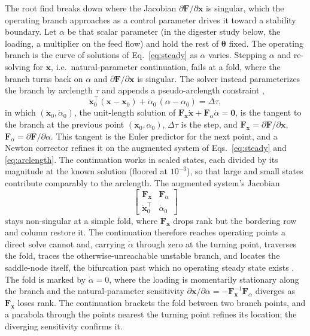\documentclass{article}
\begin{document}
The root find breaks down where the Jacobian \(\partial\mathbf{F}/\partial\mathbf{x}\) is singular, which the operating branch approaches as a control parameter drives it toward a stability boundary. Let \(\alpha\) be that scalar parameter (in the digester study below, the loading, a multiplier on the feed flow) and hold the rest of \(\boldsymbol{\theta}\) fixed. The operating branch is the curve of solutions of Eq.~\eqref{eq:steady} as \(\alpha\) varies. Stepping \(\alpha\) and re-solving for \(\mathbf{x}\), i.e.\ natural-parameter continuation, fails at a fold, where the branch turns back on \(\alpha\) and \(\partial\mathbf{F}/\partial\mathbf{x}\) is singular. The solver instead parameterizes the branch by arclength \(\tau\) and appends a pseudo-arclength constraint \citep{allgower2003},
\begin{equation}
  \dot{\mathbf{x}}_0^{\top}(\mathbf{x}-\mathbf{x}_0) + \dot{\alpha}_0\,(\alpha-\alpha_0) = \Delta\tau,
  \label{eq:arclength}
\end{equation}
in which \((\dot{\mathbf{x}}_0,\dot{\alpha}_0)\), the unit-length solution of \(\mathbf{F}_{\mathbf{x}}\dot{\mathbf{x}}+\mathbf{F}_{\alpha}\dot{\alpha}=\mathbf{0}\), is the tangent to the branch at the previous point \((\mathbf{x}_0,\alpha_0)\), \(\Delta\tau\) is the step, and \(\mathbf{F}_{\mathbf{x}}=\partial\mathbf{F}/\partial\mathbf{x}\), \(\mathbf{F}_{\alpha}=\partial\mathbf{F}/\partial\alpha\). This tangent is the Euler predictor for the next point, and a Newton corrector refines it on the augmented system of Eqs.~\eqref{eq:steady} and \eqref{eq:arclength}. The continuation works in scaled states, each divided by its magnitude at the known solution (floored at \(10^{-3}\)), so that large and small states contribute comparably to the arclength. The augmented system's Jacobian
\begin{equation}
  \begin{bmatrix} \mathbf{F}_{\mathbf{x}} & \mathbf{F}_{\alpha} \\[3pt] \dot{\mathbf{x}}_0^{\top} & \dot{\alpha}_0 \end{bmatrix}
  \label{eq:bordered}
\end{equation}
stays non-singular at a simple fold, where \(\mathbf{F}_{\mathbf{x}}\) drops rank but the bordering row and column restore it. The continuation therefore reaches operating points a direct solve cannot and, carrying \(\dot{\alpha}\) through zero at the turning point, traverses the fold, traces the otherwise-unreachable unstable branch, and locates the saddle-node itself, the bifurcation past which no operating steady state exists \citep{seydel2010}. The fold is marked by \(\dot{\alpha}=0\), where the loading is momentarily stationary along the branch and the natural-parameter sensitivity \(\partial\mathbf{x}/\partial\alpha=-\mathbf{F}_{\mathbf{x}}^{-1}\mathbf{F}_{\alpha}\) diverges as \(\mathbf{F}_{\mathbf{x}}\) loses rank. The continuation brackets the fold between two branch points, and a parabola through the points nearest the turning point refines its location; the diverging sensitivity confirms it.
\end{document}
